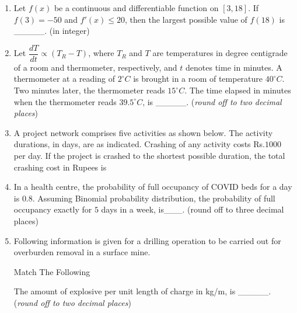 \documentclass[journal,12pt,onecolumn]{IEEEtran}
\theoremstyle{remark}
\begin{document}
\begin{enumerate}
\hfill{}
\begin{multicols}{4}
\begin{enumerate}
\item $20, 15$
\item $0, 30$
\item $0, 31$
\item $40, 0$
\end{enumerate}
\end{multicols}

\item Let $f(x)$ be a continuous and differentiable function on $[3,18]$. 
If $f(3) = -50$ and $f'(x) \leq 20$, then the largest possible value of $f(18)$ is \_\_\_\_\_. (in integer)
\hfill{}

\item  Let $\dfrac{dT}{dt} \propto (T_R - T)$, where $T_R$ and $T$ are temperatures in degree centigrade of a room and thermometer, respectively, and $t$ denotes time in minutes. 
A thermometer at a reading of $2^{\circ}C$ is brought in a room of temperature $40^{\circ}C$. 
Two minutes later, the thermometer reads $15^{\circ}C$. 
The time elapsed in minutes when the thermometer reads $39.5^{\circ}C$, is \_\_\_\_\_. 
(\textit{round off to two decimal places})

\hfill{}
\item A project network comprises five activities as shown below. The activity durations, in days, are as
indicated. Crashing of any activity costs Rs.$1000$ per day. If the project is crashed to the shortest possible duration, the total crashing cost in Rupees is

\hfill{}
\item In a health centre, the probability of full occupancy of COVID beds for a day is $0.8$. Assuming Binomial probability distribution, the probability of full occupancy exactly for $5$ days in a week, is\_\_\_. (round off to three decimal places) 

\hfill{}
\item Following information is given for a drilling operation to be carried out for 
overburden removal in a surface mine. 
\begin{table}[H]
  \centering
  \caption{Match The Following}
  
  \label{tab:table8}
\end{table}

The amount of explosive per unit length of charge in kg/m, is \_\_\_\_\_. 
(\textit{round off to two decimal places})


\end{enumerate}
\end{document}
